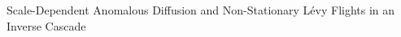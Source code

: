 \documentclass[]{article}
\begin{document}
Scale-Dependent Anomalous Diffusion and Non-Stationary Lévy Flights in an Inverse Cascade
\end{document}
